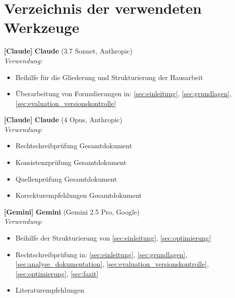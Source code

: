 \section{Verzeichnis der verwendeten Werkzeuge}
\label{sec:tools}

\begin{list}{}{%
\setlength{\labelwidth}{1.5cm}%
\setlength{\labelsep}{0.3cm}%
\setlength{\leftmargin}{2cm}%
\setlength{\itemindent}{0cm}%
\setlength{\listparindent}{0cm}%
}

\item[\textbf{[Claude]}] \textbf{Claude} (3.7 Sonnet, Anthropic)\\
\emph{Verwendung:} 
\begin{itemize}
  \item Beihilfe für die Gliederung und Strukturierung der Hausarbeit
  \item Überarbeitung von Formulierungen in: \ref{sec:einleitung}, \ref{sec:grundlagen}, \ref{sec:evaluation_versionskontrolle}
\end{itemize}

\item[\textbf{[Claude]}] \textbf{Claude} (4 Opus, Anthropic)\\
\emph{Verwendung:} 
\begin{itemize}
  \item Rechtschreibprüfung Gesamtdokument
  \item Konsistenzprüfung Gesamtdokument
  \item Quellenprüfung Gesamtdokument
  \item  Korrekturempfehlungen Gesamtdokument
\end{itemize}

\item[\textbf{[Gemini]}] \textbf{Gemini} (Gemini 2.5 Pro, Google)\\
\emph{Verwendung:} 
\begin{itemize}
  \item Beihilfe der Strukturierung von \ref{sec:einleitung}, \ref{sec:optimierung}
  \item Rechtschreibprüfung in: \ref{sec:einleitung}, \ref{sec:grundlagen}, \ref{sec:analyse_dokumentation}, \ref{sec:evaluation_versionskontrolle}, \ref{sec:optimierung}, \ref{sec:fazit}
  \item Literaturempfehlungen
\end{itemize}

\end{list}